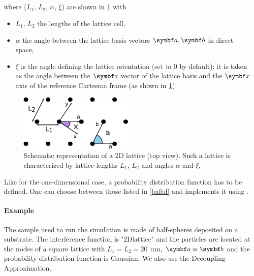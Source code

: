 \FloatBarrier

\newpage
\subsection{}
where ($L_1$, $L_2$, $\alpha$, $\xi$) are shown in \cref{fig:2dlattice} with
\begin{itemize}
\item[]$L_1$, $L_2$ the lengths of the lattice cell,
\item[]$\alpha$ the angle between the lattice basis vectors $\v{a}, \v{b}$ in direct space,
\item[] $\xi$ is the angle defining the lattice orientation (set to $0$ by default); it is taken as the angle between the $\v{a}$ vector of the lattice basis and the $\v{x}$ axis of the reference Cartesian frame (as shown in \cref{fig:2dlattice}).
\end{itemize}

\begin{figure}[tb]
\begin{center}
\includegraphics[width=0.5\textwidth]{fig/drawing/2Dlattice.pdf}
\end{center}
\caption{Schematic representation of a 2D lattice (top view). Such a lattice is characterized by lattice lengths $L_1$, $L_2$ and angles $\alpha$ and $\xi$.}
\label{fig:2dlattice}
\end{figure}

Like for the one-dimensional case, a probability distribution function  has to be defined. One can choose between those listed in \cref{baftd} and implements it using .

\paragraph{Example} The sample used to run the simulation is made of half-spheres deposited on a substrate. The interference function is "2Dlattice" and the particles are located at the nodes of a square lattice with $L_1=L_2=20$~nm, $\v{a}\equiv \v{b}$ and the probability distribution function is Gaussian. We also use the Decoupling Approximation.

